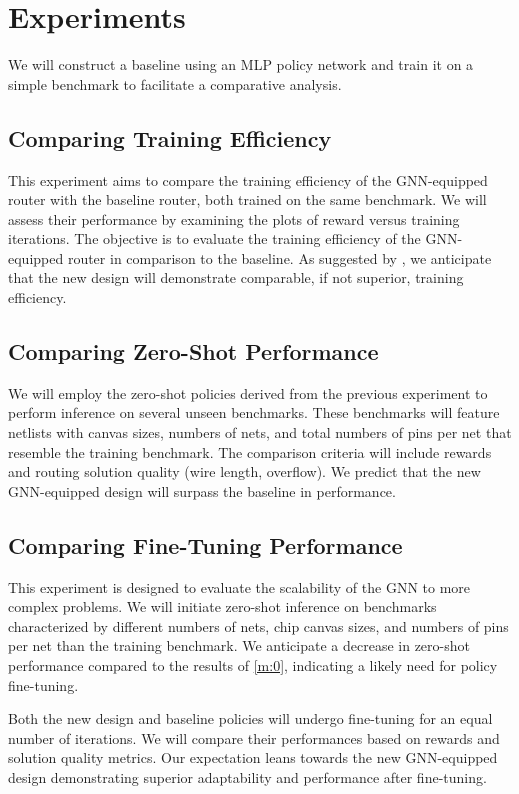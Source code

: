 \documentclass[letterpaper]{article}
\begin{document}
    
\section{Experiments}
We will construct a baseline using an MLP policy network and train it on a simple benchmark to facilitate a comparative analysis.

\subsection{Comparing Training Efficiency}
This experiment aims to compare the training efficiency of the GNN-equipped router with the baseline router, both trained on the same benchmark. We will assess their performance by examining the plots of reward versus training iterations. The objective is to evaluate the training efficiency of the GNN-equipped router in comparison to the baseline. As suggested by \cite{Wang2018}, we anticipate that the new design will demonstrate comparable, if not superior, training efficiency.

\subsection{Comparing Zero-Shot Performance} \label{m:0}
We will employ the zero-shot policies derived from the previous experiment to perform inference on several unseen benchmarks. These benchmarks will feature netlists with canvas sizes, numbers of nets, and total numbers of pins per net that resemble the training benchmark. The comparison criteria will include rewards and routing solution quality (wire length, overflow). We predict that the new GNN-equipped design will surpass the baseline in performance.

\subsection{Comparing Fine-Tuning Performance}
This experiment is designed to evaluate the scalability of the GNN to more complex problems. We will initiate zero-shot inference on benchmarks characterized by different numbers of nets, chip canvas sizes, and numbers of pins per net than the training benchmark. We anticipate a decrease in zero-shot performance compared to the results of \autoref{m:0}, indicating a likely need for policy fine-tuning.

Both the new design and baseline policies will undergo fine-tuning for an equal number of iterations. We will compare their performances based on rewards and solution quality metrics. Our expectation leans towards the new GNN-equipped design demonstrating superior adaptability and performance after fine-tuning.
\end{document}
